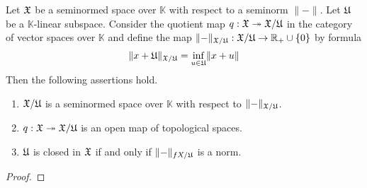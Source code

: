 \begin{theorem}\label{theorem:quotients_of_seminormed_spaces}
   Let ${\mathfrak X}$ be a seminormed space over $\mathbb{K}$ with respect to a seminorm $\lVert - \rVert$. Let ${\mathfrak U}$ be a $\mathbb{K}$-linear subspace. Consider the quotient map $q:{\mathfrak X}\twoheadrightarrow {\mathfrak X}/{\mathfrak U}$ in the category of vector spaces over $\mathbb{K}$ and define the map $\lVert-\rVert_{{\mathfrak X}/{\mathfrak U}}:{\mathfrak X}/{\mathfrak U} \rightarrow {\mathbb R}_+\cup \{0\}$ by formula
   $$\lVert x + {\mathfrak U} \rVert_{{\mathfrak X}/{\mathfrak U}} = \inf_{u \in {\mathfrak U}}\lVert x + u \rVert$$
   Then the following assertions hold.   
   \begin{enumerate}[label=\emph{\textbf{(\arabic*)}}, leftmargin=*]
      \item ${\mathfrak X}/{\mathfrak U}$ is a seminormed space over $\mathbb{K}$ with respect to $\lVert-\rVert_{{\mathfrak X}/{\mathfrak U}}$.
      \item $q:{\mathfrak X}\twoheadrightarrow {\mathfrak X}/{\mathfrak U}$ is an open map of topological spaces.
      \item ${\mathfrak U}$ is closed in ${\mathfrak X}$ if and only if $\lVert-\rVert_{\\fX/{\mathfrak U}}$ is a norm.
   \end{enumerate}
\end{theorem}
\begin{proof}
   
\end{proof}






\small




